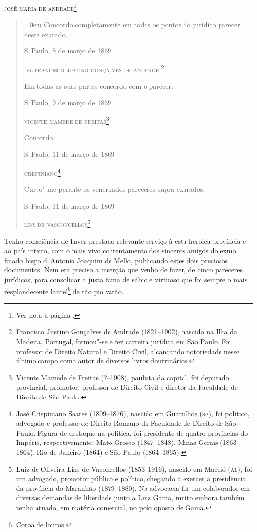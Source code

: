 \hfill\textsc{josé maria de andrade}\footnote{Ver nota à página \pageref{maria}.}

\begin{quote}\parindent=0em
Concordo completamente em todos os pontos do jurídico parecer neste exarado.

S.\,Paulo, 8 de março de 1869

\textsc{dr.\,francisco justino gonçalves de andrade}.\footnote{Francisco \label{justino}
  Justino Gonçalves de Andrade (1821--1902), nascido na Ilha da Madeira,
  Portugal, formou"-se e fez carreira jurídica em São Paulo. Foi
  professor de Direito Natural e Direito Civil, alcançando notoriedade
  nesse último campo como autor de diversos livros doutrinários.}\bigskip

Em todas as suas partes concordo com o parecer.

S.\,Paulo, 9 de março de 1869

\textsc{vicente mamede de freitas}\footnote{Vicente Mamede de Freitas
  (?--1908), paulista da capital, foi deputado provincial, promotor,
  professor de Direito Civil e diretor da Faculdade de Direito de São
  Paulo.}\bigskip

Concordo.

S.\,Paulo, 11 de março de 1869

\textsc{crispiniano}\footnote{José Crispiniano Soares (1809--1876), \label{crispiniano}
  nascido em Guarulhos (\textsc{sp}), foi político, advogado e professor de
  Direito Romano da Faculdade de Direito de São Paulo. Figura de
  destaque na política, foi presidente de quatro províncias do Império,
  respectivamente: Mato Grosso (1847--1848), Minas Gerais (1863--1864),
  Rio de Janeiro (1864) e São Paulo (1864--1865).}\bigskip

Curvo"-me perante os venerandos pareceres supra exarados.

S.\,Paulo, 11 de março de 1869

\textsc{lins de vasconcellos}\footnote{Luiz de Oliveira Lins de
  Vaconcellos (1853--1916), nascido em Maceió (\textsc{al}), foi um advogado,
  promotor público e político, chegando a exercer a presidência da
  província do Maranhão (1879--1880). Na advocacia foi um colaborador em
  diversas demandas de liberdade junto a Luiz Gama, muito embora também
  tenha atuado, em matéria comercial, no polo oposto de Gama.}
  \end{quote}

Tenho consciência de haver prestado relevante serviço à esta heroica
província e ao país inteiro, com o mais vivo contentamento dos sinceros
amigos do exmo.\,finado bispo d.\,Antonio Joaquim de Mello, publicando
estes dois preciosos documentos. Nem era preciso a inserção que venho de
fazer, de cinco pareceres jurídicos, para consolidar a justa fama de
sábio e virtuoso que foi sempre o mais resplandecente laurel\footnote{
  Coroa de louros.} de tão pio varão.

